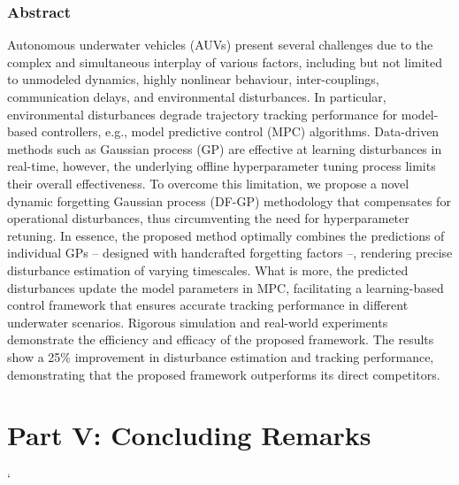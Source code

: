 \documentclass[
10pt, %
b5paper, %
twoside, %
openright  %
]{book}  %
\begin{document}
\section{Abstract}
Autonomous underwater vehicles (AUVs) present several challenges due to the complex and simultaneous interplay of various factors, including but not limited to unmodeled dynamics, highly nonlinear behaviour, inter-couplings, communication delays, and environmental disturbances. In particular, environmental disturbances degrade trajectory tracking performance for model-based controllers, e.g., model predictive control (MPC) algorithms. Data-driven methods such as Gaussian process (GP) are effective at learning disturbances in real-time, however, the underlying offline hyperparameter tuning process limits their overall effectiveness. To overcome this limitation, we propose a novel dynamic forgetting Gaussian process (DF-GP) methodology that compensates for operational disturbances, thus circumventing the need for hyperparameter retuning. In essence, the proposed method optimally combines the predictions of individual GPs -- designed with handcrafted forgetting factors --, rendering precise disturbance estimation of varying timescales. What is more, the predicted disturbances update the model parameters in MPC, facilitating a learning-based control framework that ensures accurate tracking performance in different underwater scenarios. Rigorous simulation and real-world experiments demonstrate the efficiency and efficacy of the proposed framework. The results show a 25\% improvement in disturbance estimation and tracking performance, demonstrating that the proposed framework outperforms its direct competitors.
\newpage





\part*{Part V: Concluding Remarks}
 
 
  


\renewcommand\bibname{Bibliography}  %

`
\end{document}
